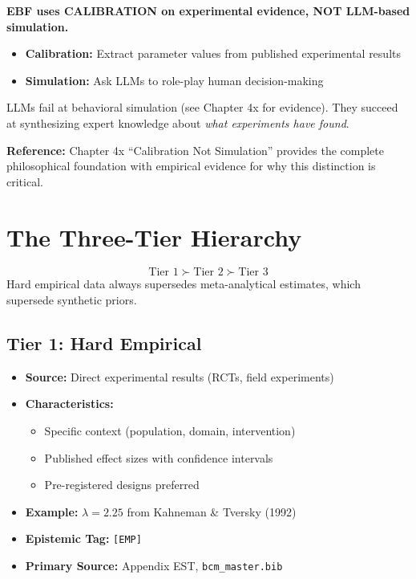 \begin{tcolorbox}[colback=red!5!white, colframe=red!75!black, title=Fundamental Distinction]
\textbf{EBF uses CALIBRATION on experimental evidence, NOT LLM-based simulation.}

\begin{itemize}[nosep]
    \item \textbf{Calibration:} Extract parameter values from published experimental results
    \item \textbf{Simulation:} Ask LLMs to role-play human decision-making
\end{itemize}

LLMs fail at behavioral simulation (see Chapter 4x for evidence). They succeed at synthesizing expert knowledge about \textit{what experiments have found}.
\end{tcolorbox}

\textbf{Reference:} Chapter 4x ``Calibration Not Simulation'' provides the complete philosophical foundation with empirical evidence for why this distinction is critical.


\section{The Three-Tier Hierarchy}
\label{sec:pm-hierarchy}

\begin{tcolorbox}[colback=green!5!white, colframe=green!75!black, title=BBB Axiom BBB-1: Evidential Precedence]
$$\text{Tier 1} \succ \text{Tier 2} \succ \text{Tier 3}$$
Hard empirical data always supersedes meta-analytical estimates, which supersede synthetic priors.
\end{tcolorbox}

\subsection{Tier 1: Hard Empirical}

\begin{itemize}[nosep]
    \item \textbf{Source:} Direct experimental results (RCTs, field experiments)
    \item \textbf{Characteristics:}
        \begin{itemize}[nosep]
            \item Specific context (population, domain, intervention)
            \item Published effect sizes with confidence intervals
            \item Pre-registered designs preferred
        \end{itemize}
    \item \textbf{Example:} $\lambda = 2.25$ from Kahneman \& Tversky (1992)
    \item \textbf{Epistemic Tag:} \texttt{[EMP]}
    \item \textbf{Primary Source:} Appendix EST, \texttt{bcm\_master.bib}
\end{itemize}

